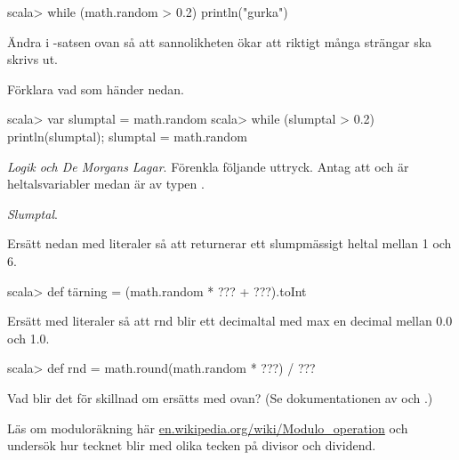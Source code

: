 {{{{\begin{REPLnonum}
scala> while (math.random > 0.2) println("gurka")
\end{REPLnonum}

\Subtask Ändra i -satsen ovan så att sannolikheten ökar att riktigt många  strängar ska skrivs ut.

\Subtask Förklara vad som händer nedan.
\begin{REPL}
scala> var slumptal = math.random
scala> while (slumptal > 0.2) { println(slumptal); slumptal = math.random }
\end{REPL}

\Task\Pen \textit{Logik och De Morgans Lagar}. Förenkla följande uttryck. Antag att  och  är heltalsvariabler medan  är av typen . 

\Subtask {}

\Subtask {}

\Subtask {}

\Subtask {}

\Subtask {}

\Subtask {}

\Subtask {}


\ExtraTasks

\Task \textit{Slumptal}.

\Subtask Ersätt  nedan med literaler så att  returnerar ett slumpmässigt heltal mellan 1 och 6.
\begin{REPLnonum}
scala> def tärning = (math.random * ??? + ???).toInt 
\end{REPLnonum}

\Subtask Ersätt  med literaler så att rnd blir ett decimaltal med max en decimal mellan 0.0 och 1.0.
\begin{REPLnonum}
scala> def rnd = math.round(math.random * ???) / ??? 
\end{REPLnonum}

\Subtask Vad blir det för skillnad om  ersätts med  ovan? (Se dokumentationen av  och .)

\AdvancedTasks

\Task Läs om moduloräkning här \href{https://en.wikipedia.org/wiki/Modulo\_operation}{en.wikipedia.org/wiki/Modulo\_operation} och undersök hur tecknet blir med olika tecken på divisor och dividend.

}}}}
